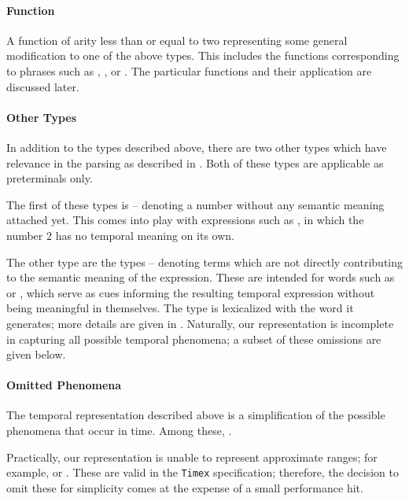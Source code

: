 \paragraph{Function}
A function of arity less than or equal to two representing some
	general modification to one of the above types.
This includes the functions corresponding to phrases such as
	, , or .
The particular functions and their application are discussed later.


\paragraph{Other Types}
In addition to the types described above, there are two other types which
	have relevance in the parsing as described in .
Both of these types are applicable as preterminals only.

The first of these types is  -- denoting a number without
	any semantic meaning attached yet.
This comes into play with expressions such as , in which
	the number $2$ has no temporal meaning on its own.

The other type are the  types -- denoting terms which are not
	directly contributing to the semantic meaning of the expression.
These are intended for words such as  or , which serve as cues
	informing the resulting temporal expression without being meaningful
	in themselves.
The  type is lexicalized with the word it generates; more details
	are given in .
Naturally, our representation is incomplete in capturing all possible
	temporal phenomena; a subset of these omissions are given below.


\paragraph{Omitted Phenomena}
The temporal representation described above is a simplification of the
	possible phenomena that occur in time.
Among these, .

Practically, our representation is unable to represent approximate ranges;
	for example,  or .
These are valid in the \texttt{Timex} specification; therefore, the decision
	to omit these for simplicity comes at the expense of a small performance hit.

